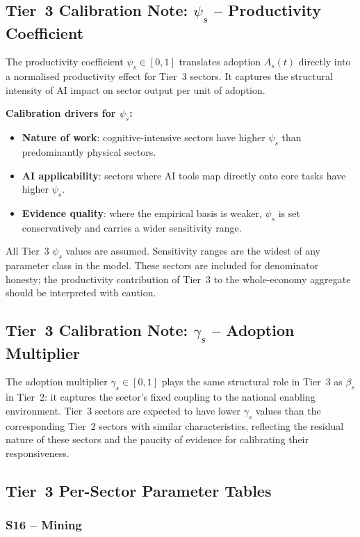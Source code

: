 \documentclass[11pt,a4paper]{article}
\begin{document}
\subsection{Tier~3 Calibration Note: $\psi_s$ -- Productivity Coefficient}

The productivity coefficient $\psi_s \in [0,1]$ translates adoption $A_s(t)$ directly into a normalised productivity effect for Tier~3 sectors. It captures the structural intensity of AI impact on sector output per unit of adoption.

\textbf{Calibration drivers for $\psi_s$:}
\begin{itemize}
  \item \textbf{Nature of work}: cognitive-intensive sectors have higher $\psi_s$ than predominantly physical sectors.
  \item \textbf{AI applicability}: sectors where AI tools map directly onto core tasks have higher $\psi_s$.
  \item \textbf{Evidence quality}: where the empirical basis is weaker, $\psi_s$ is set conservatively and carries a wider sensitivity range.
\end{itemize}

All Tier~3 $\psi_s$ values are assumed. Sensitivity ranges are the widest of any parameter class in the model. These sectors are included for denominator honesty; the productivity contribution of Tier~3 to the whole-economy aggregate should be interpreted with caution.

\subsection{Tier~3 Calibration Note: $\gamma_s$ -- Adoption Multiplier}

The adoption multiplier $\gamma_s \in [0,1]$ plays the same structural role in Tier~3 as $\beta_s$ in Tier~2: it captures the sector's fixed coupling to the national enabling environment. Tier~3 sectors are expected to have lower $\gamma_s$ values than the corresponding Tier~2 sectors with similar characteristics, reflecting the residual nature of these sectors and the paucity of evidence for calibrating their responsiveness.

\subsection{Tier~3 Per-Sector Parameter Tables}

\subsubsection*{S16 -- Mining}
\end{document}
